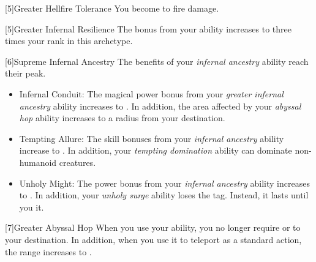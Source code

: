         [5]{Greater Hellfire Tolerance} You become  to fire damage.

        [5]{Greater Infernal Resilience}  The bonus from your  ability increases to three times your rank in this archetype.

        [6]{Supreme Infernal Ancestry} The benefits of your \textit{infernal ancestry} ability reach their peak.
        \begin{itemize}
            \item Infernal Conduit: The magical power bonus from your \textit{greater infernal ancestry} ability increases to .
                In addition, the area affected by your \textit{abyssal hop} ability increases to a \medarea radius from your destination.
            \item Tempting Allure: The skill bonuses from your \textit{infernal ancestry} ability increase to .
                In addition, your \textit{tempting domination} ability can dominate non-humanoid creatures.
            \item Unholy Might: The power bonus from your \textit{infernal ancestry} ability increases to .
                In addition, your \textit{unholy surge} ability loses the  tag.
                Instead, it lasts until you  it.
        \end{itemize}

        [7]{Greater Abyssal Hop} When you use your  ability, you no longer require  or  to your destination.
        In addition, when you use it to teleport as a standard action, the range increases to \distrange.




